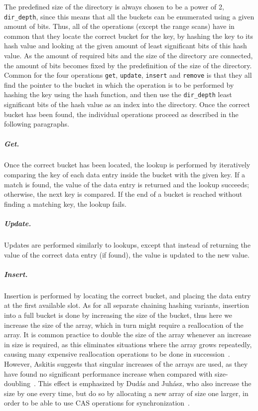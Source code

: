 \documentclass[11pt]{article} %
\begin{document}
The predefined size of the directory is always chosen to be a power of 2, \verb|dir_depth|, since this means that all the buckets can be enumerated using a given amount of bits. Thus, all of the operations (except the range scans) have in common that they locate the correct bucket for the key, by hashing the key to its hash value and looking at the given amount of least significant bits of this hash value. As the amount of required bits and the size of the directory are connected, the amount of bits becomes fixed by the predefinition of the size of the directory.\\

Common for the four operations \verb|get|, \verb|update|, \verb|insert| and \verb|remove| is that they all find the pointer to the bucket in which the operation is to be performed by hashing the key using the hash function, and then use the \verb|dir_depth| least significant bits of the hash value as an index into the directory. Once the correct bucket has been found, the individual operations proceed as described in the following paragraphs.

\subparagraph{Get.} Once the correct bucket has been located, the lookup is performed by iteratively comparing the key of each data entry inside the bucket with the given key. If a match is found, the value of the data entry is returned and the lookup succeeds; otherwise, the next key is compared. If the end of a bucket is reached without finding a matching key, the lookup fails. 

\subparagraph{Update.} Updates are performed similarly to lookups, except that instead of returning the value of the correct data entry (if found), the value is updated to the new value.

\subparagraph{Insert.} Insertion is performed by locating the correct bucket, and placing the data entry at the first available slot. As for all separate chaining hashing variants, insertion into a full bucket is done by increasing the size of the bucket, thus here we increase the size of the array, which in turn might require a reallocation of the array. It is common practice to double the size of the array whenever an increase in size is required, as this eliminates situations where the array grows repeatedly, causing many expensive reallocation operations to be done in succession~\cite{DPH90}. \\

However, Askitis suggests that singular increases of the arrays are used, as they have found no significant performance increase when compared with size-doubling~\cite{NA09}. This effect is emphasized by Dudás and Juhász, who also increase the size by one every time, but do so by allocating a new array of size one larger, in order to be able to use CAS operations for synchronization~\cite{ADSJ13}. 
\end{document}
